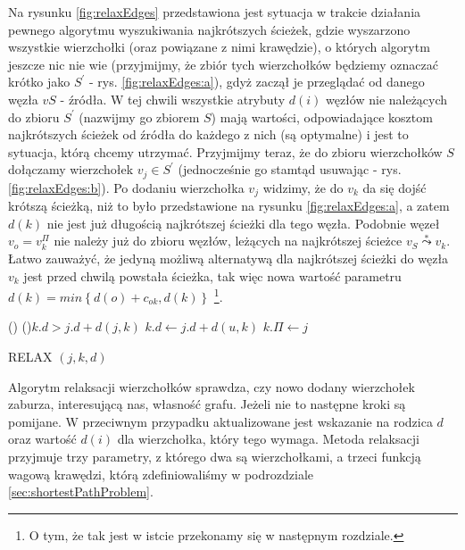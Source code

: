 Na rysunku \ref{fig:relaxEdges} przedstawiona jest sytuacja w trakcie działania pewnego algorytmu wyszukiwania najkrótszych ścieżek, gdzie wyszarzono wszystkie wierzchołki (oraz powiązane z nimi krawędzie), o których algorytm jeszcze nic nie wie (przyjmijmy, że zbiór tych wierzchołków będziemy oznaczać krótko jako $S^{'}$ - rys. \ref{fig:relaxEdges:a}), gdyż zaczął je przeglądać od danego węzła $v{S}$ - źródła. W tej chwili wszystkie atrybuty $d \left( i \right)$ węzłów nie należących do zbioru $S^{'}$ (nazwijmy go zbiorem $S$) mają wartości, odpowiadające kosztom najkrótszych ścieżek od źródła do każdego z nich (są optymalne) i jest to sytuacja, którą chcemy utrzymać. Przyjmijmy teraz, że do zbioru wierzchołków $S$ dołączamy wierzchołek $v_{j} \in S^{'}$ (jednocześnie go stamtąd usuwając - rys. \ref{fig:relaxEdges:b}). Po dodaniu wierzchołka $v_{j}$ widzimy, że do $v_{k}$ da się dojść krótszą ścieżką, niż to było przedstawione na rysunku \ref{fig:relaxEdges:a}, a zatem $d \left( k \right)$ nie jest już długością najkrótszej ścieżki dla tego węzła. Podobnie węzeł $v_{o} = v_{k}^{\Pi}$ nie należy już do zbioru węzłów, leżących na najkrótszej ścieżce $v_{S} \overset{*}\leadsto v_{k}$. Łatwo zauważyć, że jedyną możliwą alternatywą dla najkrótszej ścieżki do węzła $v_{k}$ jest przed chwilą powstała ścieżka, tak więc nowa wartość parametru $d \left( k \right) = min \left\{ d \left( o \right) + c_{ok}, d \left( k \right) \right\} $ \footnote{O tym, że tak jest w istcie przekonamy się w następnym rozdziale.}.

\begin{algorithm}[!htbp]
\DontPrintSemicolon
\Begin(){
	\If(){$ k.d > j.d + d \left( j, k \right)$} {
		$ k.d \longleftarrow j.d + d \left( u, k \right)$ \;
		$ k.\Pi \longleftarrow j$ \;
	}
}
\caption{RELAX $\left( j, k, d \right)$ \label{alg:relax}}
\end{algorithm}

Algorytm relaksacji wierzchołków sprawdza, czy nowo dodany wierzchołek zaburza, interesującą nas, własność grafu. Jeżeli nie to następne kroki są pomijane. W przeciwnym przypadku aktualizowane jest wskazanie na rodzica $d$ oraz wartość $d \left( i \right)$  dla wierzchołka, który tego wymaga. Metoda relaksacji przyjmuje trzy parametry, z którego dwa są wierzchołkami, a trzeci funkcją wagową krawędzi, którą zdefiniowaliśmy w podrozdziale \ref{sec:shortestPathProblem}.

